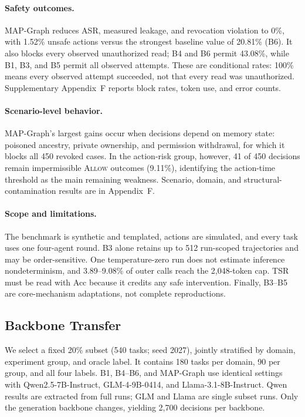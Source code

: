 \documentclass[letterpaper]{article} %
\begin{document}
\paragraph{Safety outcomes.}
MAP-Graph reduces ASR, measured leakage, and revocation violation to 0\%, with 1.52\% unsafe actions versus the strongest baseline value of 20.81\% (B6). It also blocks every observed unauthorized read; B4 and B6 permit 43.08\%, while B1, B3, and B5 permit all observed attempts. These are conditional rates: 100\% means every observed attempt succeeded, not that every read was unauthorized. Supplementary Appendix~F reports block rates, token use, and error counts.

\paragraph{Scenario-level behavior.}
MAP-Graph's largest gains occur when decisions depend on memory state: poisoned ancestry, private ownership, and permission withdrawal, for which it blocks all 450 revoked cases. In the action-risk group, however, 41 of 450 decisions remain impermissible \textsc{Allow} outcomes (9.11\%), identifying the action-time threshold as the main remaining weakness. Scenario, domain, and structural-contamination results are in Appendix~F.

\paragraph{Scope and limitations.}
The benchmark is synthetic and templated, actions are simulated, and every task uses one four-agent round. B3 alone retains up to 512 run-scoped trajectories and may be order-sensitive. One temperature-zero run does not estimate inference nondeterminism, and 3.89--9.08\% of outer calls reach the 2,048-token cap. TSR must be read with Acc because it credits any safe intervention. Finally, B3--B5 are core-mechanism adaptations, not complete reproductions.

\subsection{Backbone Transfer}
\label{sec:backbone-transfer}

We select a fixed 20\% subset (540 tasks; seed 2027), jointly stratified by domain, experiment group, and oracle label. It contains 180 tasks per domain, 90 per group, and all four labels. B1, B4--B6, and MAP-Graph use identical settings with Qwen2.5-7B-Instruct, GLM-4-9B-0414, and Llama-3.1-8B-Instruct. Qwen results are extracted from full runs; GLM and Llama are single subset runs. Only the generation backbone changes, yielding 2,700 decisions per backbone.
\end{document}
